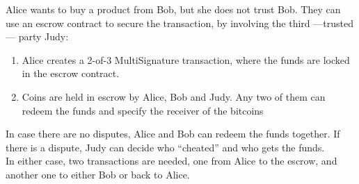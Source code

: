 Alice wants to buy a product from Bob, but she does not trust Bob. They can use an escrow contract to secure the transaction, by involving the third ---trusted--- party Judy:
\begin{enumerate}
   \item Alice creates a 2-of-3 MultiSignature transaction, where the funds are locked in the escrow contract.
   \item Coins are held in escrow by Alice, Bob and Judy. Any two of them can redeem the funds and specify the receiver of the bitcoins
\end{enumerate}
In case there are no disputes, Alice and Bob can redeem the funds together. If there is a dispute, Judy can decide who ``cheated'' and who gets the funds.\\
In either case, two transactions are needed, one from Alice to the escrow, and another one to either Bob or back to Alice.